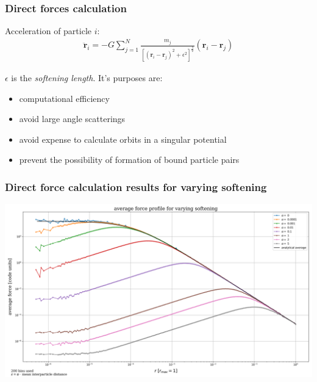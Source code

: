 
\begin{frame}
	\frametitle{Direct forces calculation}
	
	Acceleration of particle $i$:
	\begin{align*}
		\ddot{\mathbf{r}}_i = - G \sum\limits_{j=1}^{N}  \frac{m_j}{[(\mathbf{r}_i - \mathbf{r}_j)^2 + \epsilon^2 ]^{\frac{3}{2}}} (\mathbf{r}_i - \mathbf{r}_j)
	\end{align*}

$\epsilon$ is the \textit{softening length}. It's purposes are:
\begin{itemize}
	\item computational efficiency
	\item avoid large angle scatterings
	\item avoid expense to calculate orbits in a singular potential
	\item prevent the possibility of formation of bound particle pairs
\end{itemize}
	
\end{frame}






\begin{frame}
	\frametitle{Direct force calculation results for varying softening}
	\includegraphics[width=\textwidth]{../results/average_direct_force/average_force_plot.png}
\end{frame}
